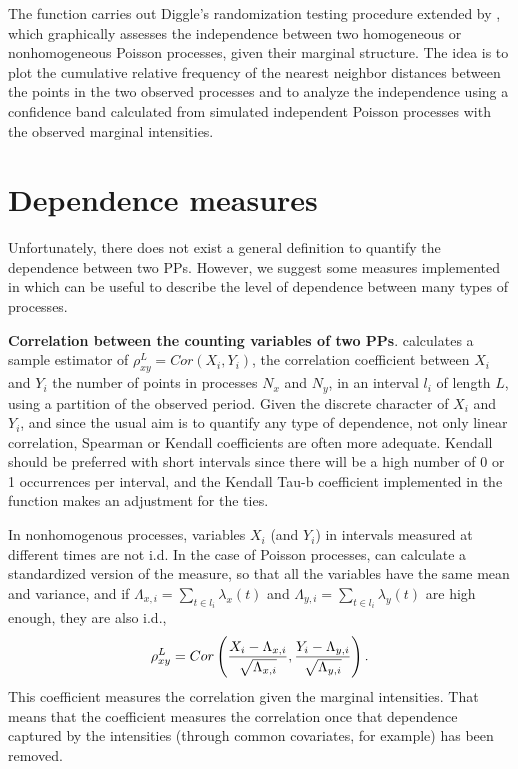  The function  carries out  Diggle's randomization testing procedure extended by \citet{Dutilleul11}, which graphically assesses the independence between two homogeneous or nonhomogeneous Poisson processes, given their marginal structure.  The idea is to plot the cumulative relative frequency of the nearest neighbor distances between the points in the two observed processes and  to analyze the independence  using a confidence band  calculated from 	simulated  independent Poisson processes with the observed  marginal  intensities. 




\section{Dependence measures}

Unfortunately,  there does not exist a  general   definition to quantify the dependence between two PPs. However, we suggest some measures implemented in  which can be  useful  to describe the  level of dependence between  many types of processes.

\label{Section5}

\textbf{Correlation between  the counting variables of two PPs}. 
    calculates  a sample estimator of   $\rho_{xy}^{L}=Cor(X_{i}, Y_{i})$, the correlation coefficient between  $X_{i}$ and $Y_{i}$ the  number of points in  processes $N_x$ and   $N_y$,  in an  interval $l_i$ of length $L$,  using a partition of the observed period. Given the discrete character of  $X_{i}$ and $Y_{i}$, and since the usual aim is  to quantify any type of dependence,  not only linear correlation,  Spearman  or Kendall  coefficients are   often more adequate.   Kendall should be preferred with  short intervals since there  will  be a high number of 0 or 1 occurrences per interval, and  the Kendall Tau-b  coefficient implemented in the function makes an adjustment for the ties. 


In nonhomogenous processes,   variables   $X_{i}$  (and $Y_{i}$)  in  intervals measured at different times are not i.d. In the case of Poisson processes,       can calculate a standardized  version of the  measure, so that all the variables   have the same mean and variance, and if  
$\Lambda_{x,i}= \sum_{t \in l_i}\lambda_x(t)$  and  
$\Lambda_{y,i}= \sum_{t \in l_i}\lambda_y(t)$ are high enough,  they  are also i.d.,
$$\rho_{xy}^L=Cor\left({X_{i}-\Lambda_{x,i} \over \sqrt{\Lambda_{x,i}}},   {Y_{i}-\Lambda _{y,i} \over \sqrt{\Lambda_{y,i}}}\right).
$$
This coefficient measures the correlation given the marginal intensities.  That means that the coefficient measures the correlation once that dependence captured by the intensities (through common covariates, for example) has been removed.



